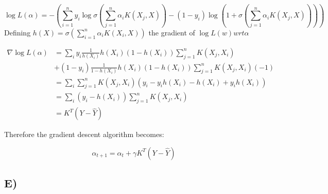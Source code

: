 \documentclass{report}
\begin{document}
\begin{equation}
  \log L(\alpha) =
  - \left(
  \sum_{i=1}^{n} y_i
  \log
  \sigma(\sum_{j=1}^{n}\alpha_iK(X_j,X))
  -
  (1-y_i)
  \log
  (1+\sigma(\sum_{j=1}^{n}\alpha_iK(X_j,X)))
  \right)
\end{equation}
Defining $h(X)=\sigma(\sum_{i=1}^{n}\alpha_i K(X_i,X))$ the gradient of $\log L(w) wrt \alpha$

\begin{equation}
  \begin{aligned}
    \nabla
    \log L(\alpha) &=
    \sum_i y_i
    \frac{1}{h(X_i)}
    h(X_i)
    (1-h(X_i))
    \sum_{j=1}^{n}K(X_j,X_i)\\
    &+
    (1-y_i)
    \frac{1}{1-h(X_i)}
    h(X_i)
    (1-h(X_i))
    \sum_{j=1}^{n}K(X_j,X_i)
    (-1)\\
    &=\sum_i
    \sum_{j=1}^{n}K(X_j,X_i)
    (y_i-y_ih(X_i)-h(X_i)+y_ih(X_i))\\
    &=\sum_i(y_i - h(X_i))\sum_{j=1}^{n}K(X_j,X_i)\\
    &=K^T(Y-\hat{Y})
  \end{aligned}
\end{equation}

Therefore the gradient descent algorithm becomes:

\begin{equation}
    \alpha_{t+1} = \alpha_t + \gamma K^T(Y - \hat{Y})
\end{equation}

\subsection*{E)}
\end{document}
